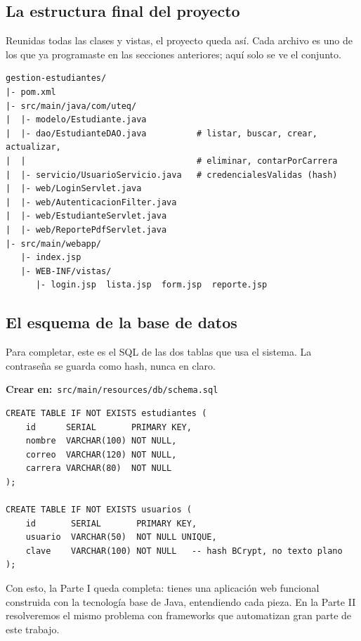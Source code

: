 \documentclass[11pt]{article}
\begin{document}
\subsection{La estructura final del proyecto}
Reunidas todas las clases y vistas, el proyecto queda así. Cada archivo es uno de los que ya programaste en las secciones anteriores; aquí solo se ve el conjunto.

\begin{cajacodigo}
\begin{lstlisting}[style=markup]
gestion-estudiantes/
|- pom.xml
|- src/main/java/com/uteq/
|  |- modelo/Estudiante.java
|  |- dao/EstudianteDAO.java          # listar, buscar, crear, actualizar,
|  |                                  # eliminar, contarPorCarrera
|  |- servicio/UsuarioServicio.java   # credencialesValidas (hash)
|  |- web/LoginServlet.java
|  |- web/AutenticacionFilter.java
|  |- web/EstudianteServlet.java
|  |- web/ReportePdfServlet.java
|- src/main/webapp/
   |- index.jsp
   |- WEB-INF/vistas/
      |- login.jsp  lista.jsp  form.jsp  reporte.jsp
\end{lstlisting}
\end{cajacodigo}
\vspace{2pt}
\subsection{El esquema de la base de datos}
Para completar, este es el SQL de las dos tablas que usa el sistema. La contraseña se guarda como hash, nunca en claro.

{\small\color{jwebazulo}\textbf{Crear en:}~}\texttt{src/\allowbreak{}main/\allowbreak{}resources/\allowbreak{}db/\allowbreak{}schema.\allowbreak{}sql}\par\nobreak\vspace{-1pt}
\begin{cajacodigo}
\begin{lstlisting}[style=sql]
CREATE TABLE IF NOT EXISTS estudiantes (
    id      SERIAL       PRIMARY KEY,
    nombre  VARCHAR(100) NOT NULL,
    correo  VARCHAR(120) NOT NULL,
    carrera VARCHAR(80)  NOT NULL
);

CREATE TABLE IF NOT EXISTS usuarios (
    id       SERIAL       PRIMARY KEY,
    usuario  VARCHAR(50)  NOT NULL UNIQUE,
    clave    VARCHAR(100) NOT NULL   -- hash BCrypt, no texto plano
);
\end{lstlisting}
\end{cajacodigo}
\vspace{2pt}
Con esto, la Parte I queda completa: tienes una aplicación web funcional construida con la tecnología base de Java, entendiendo cada pieza. En la Parte II resolveremos el mismo problema con frameworks que automatizan gran parte de este trabajo.
\end{document}
